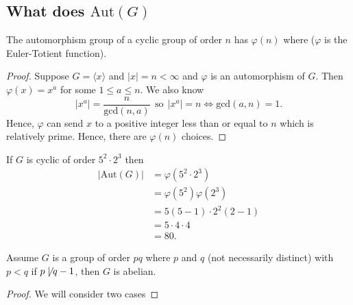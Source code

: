 \subsection{What does \( \text{Aut}(G) \)} 

\begin{prop}
    The automorphism group of a cyclic group of order \( n  \) has \( \varphi(n) \) where (\( \varphi  \) is the Euler-Totient function).
\end{prop}

\begin{proof}
    Suppose \( G = \langle x  \rangle \) and \( | x  |  = n < \infty   \) and \( \varphi  \) is an automorphism of \( G  \). Then \( \varphi(x) = x^{a}  \) for some \( 1 \leq a \leq n  \). We also know 
    \[  | x^{a} |  = \frac{ n  }{  \text{gcd}(n,a)  }  \ \ \text{so} \ \ | x^{a} |  = n  \iff \text{gcd}(a,n) = 1.   \]
    Hence, \( \varphi  \) can send \( x  \) to a positive integer less than or equal to \( n  \) which is relatively prime. Hence, there are \( \varphi(n) \) choices. 
\end{proof}

\begin{eg}
    If \( G  \) is cyclic of order \( 5^{2} \cdot 2^{3} \) then 
    \begin{align*}
      | \text{Aut}(G)  |  &= \varphi(5^{2} \cdot 2^{3}) \\
                          &= \varphi(5^{2})\varphi(2^{3}) \\
                          &= 5(5 - 1) \cdot 2^{2}(2 - 1) \\
                          &= 5 \cdot 4 \cdot 4 \\
                          &= 80.
    \end{align*}
\end{eg}

\begin{prop}
    Assume \(G  \) is a group of order \( p q  \) where \( p  \) and \( q  \) (not necessarily distinct) with \( p < q  \) if \( p \not\mid q - 1  \), then \( G  \) is abelian. 
\end{prop}

\begin{proof}
We will consider two cases
\end{proof}

